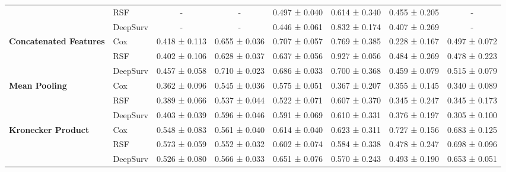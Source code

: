 \begin{sidewaystable}[htbp]
\begin{tabular}{@{}llcccccc@{}}
        & RSF & - & - & 0.497 ± 0.040 & 0.614 ± 0.340 & 0.455 ± 0.205 & - \\
        & DeepSurv & - & - & 0.446 ± 0.061 & 0.832 ± 0.174 & 0.407 ± 0.269 & - \\
        \midrule
        \multirow{3}{*}{\textbf{Concatenated Features}} & Cox & 0.418 ± 0.113 & 0.655 ± 0.036 & 0.707 ± 0.057 & 0.769 ± 0.385 & 0.228 ± 0.167 & 0.497 ± 0.072 \\
        & RSF & 0.402 ± 0.106 & 0.628 ± 0.037 & 0.637 ± 0.056 & 0.927 ± 0.056 & 0.484 ± 0.269 & 0.478 ± 0.223 \\
        & DeepSurv & 0.457 ± 0.058 & 0.710 ± 0.023 & 0.686 ± 0.033 & 0.700 ± 0.368 & 0.459 ± 0.079 & 0.515 ± 0.079 \\
        \midrule
        \multirow{3}{*}{\textbf{Mean Pooling}} & Cox & 0.362 ± 0.096 & 0.545 ± 0.036 & 0.575 ± 0.051 & 0.367 ± 0.207 & 0.355 ± 0.145 & 0.340 ± 0.089 \\
        & RSF & 0.389 ± 0.066 & 0.537 ± 0.044 & 0.522 ± 0.071 & 0.607 ± 0.370 & 0.345 ± 0.247 & 0.345 ± 0.173 \\
        & DeepSurv & 0.403 ± 0.039 & 0.596 ± 0.046 & 0.591 ± 0.069 & 0.610 ± 0.331 & 0.376 ± 0.197 & 0.305 ± 0.100 \\
        \midrule
        \multirow{3}{*}{\textbf{Kronecker Product}} & Cox & 0.548 ± 0.083 & 0.561 ± 0.040 & 0.614 ± 0.040 & 0.623 ± 0.311 & 0.727 ± 0.156 & 0.683 ± 0.125 \\
        & RSF & 0.573 ± 0.059 & 0.552 ± 0.032 & 0.602 ± 0.074 & 0.584 ± 0.338 & 0.478 ± 0.247 & 0.698 ± 0.096 \\
        & DeepSurv & 0.526 ± 0.080 & 0.566 ± 0.033 & 0.651 ± 0.076 & 0.570 ± 0.243 & 0.493 ± 0.190 & 0.653 ± 0.051 \\
        \bottomrule
    \end{tabular}
\end{sidewaystable}

